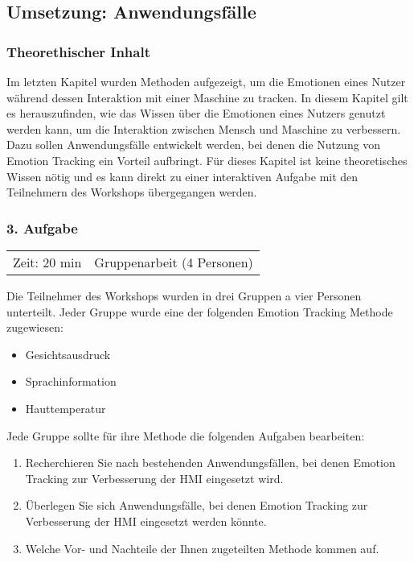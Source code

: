 \subsection{Umsetzung: Anwendungsfälle}\label{Umsetzung_Anwendungsfaelle}
\subsubsection*{Theorethischer Inhalt}
Im letzten Kapitel wurden Methoden aufgezeigt, um die Emotionen eines Nutzer während dessen Interaktion mit einer Maschine zu tracken. In diesem Kapitel gilt es herauszufinden, wie das Wissen über die Emotionen eines Nutzers genutzt werden kann, um die Interaktion zwischen Mensch und Maschine zu verbessern. Dazu sollen Anwendungsfälle entwickelt werden, bei denen die Nutzung von Emotion Tracking ein Vorteil aufbringt. Für dieses Kapitel ist keine theoretisches Wissen nötig und es kann direkt zu einer interaktiven Aufgabe mit den Teilnehmern des Workshops übergegangen werden.
\newline
\subsubsection*{3. Aufgabe}
\begin{tabular}{c c }
	Zeit: 20 min & Gruppenarbeit (4 Personen)\\
\end{tabular}

Die Teilnehmer des Workshops wurden in drei Gruppen a vier Personen unterteilt. Jeder Gruppe wurde eine der folgenden Emotion Tracking Methode zugewiesen:
\begin{itemize}
	\item Gesichtsausdruck
	\item Sprachinformation
	\item Hauttemperatur
\end{itemize}

Jede Gruppe sollte für ihre Methode die folgenden Aufgaben bearbeiten:
\begin{enumerate}
	\item Recherchieren Sie nach bestehenden Anwendungsfällen, bei denen Emotion Tracking zur Verbesserung der \ac{HMI} eingesetzt wird.
	\item Überlegen Sie sich Anwendungsfälle, bei denen Emotion Tracking zur Verbesserung der \ac{HMI} eingesetzt werden könnte.
	\item Welche Vor- und Nachteile der Ihnen zugeteilten Methode kommen auf.
\end{enumerate}
\vspace{2mm}

